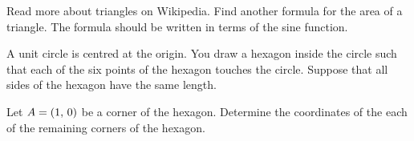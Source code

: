 \documentclass[a4paper,oneside,12pt]{article}
\begin{document}
\begin{problem}
\item Read more about triangles on Wikipedia.  Find another formula
  for the area of a triangle.  The formula should be written in terms
  of the sine function.

\item A unit circle is centred at the origin.  You draw a hexagon
  inside the circle such that each of the six points of the hexagon
  touches the circle.  Suppose that all sides of the hexagon have the
  same length.
  \begin{packedenum}
  \item Let $A = \left\lparen{1},\, {0}\right\rparen$ be a corner of the hexagon.  Determine
    the coordinates of the each of the remaining corners of the
    hexagon.
  \end{packedenum}
\end{problem}
\end{document}

